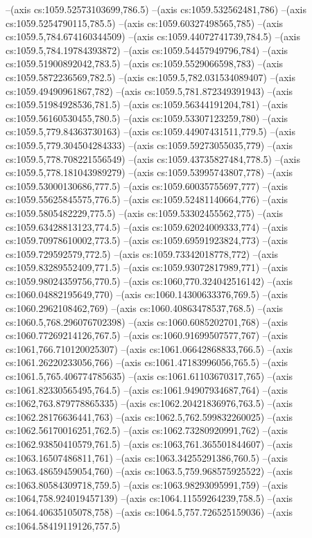 --(axis cs:1059.52573103699,786.5)
--(axis cs:1059.532562481,786)
--(axis cs:1059.5254790115,785.5)
--(axis cs:1059.60327498565,785)
--(axis cs:1059.5,784.674160344509)
--(axis cs:1059.44072741739,784.5)
--(axis cs:1059.5,784.19784393872)
--(axis cs:1059.54457949796,784)
--(axis cs:1059.51900892042,783.5)
--(axis cs:1059.5529066598,783)
--(axis cs:1059.5872236569,782.5)
--(axis cs:1059.5,782.031534089407)
--(axis cs:1059.49490961867,782)
--(axis cs:1059.5,781.872349391943)
--(axis cs:1059.51984928536,781.5)
--(axis cs:1059.56344191204,781)
--(axis cs:1059.56160530455,780.5)
--(axis cs:1059.53307123259,780)
--(axis cs:1059.5,779.84363730163)
--(axis cs:1059.44907431511,779.5)
--(axis cs:1059.5,779.304504284333)
--(axis cs:1059.59273055035,779)
--(axis cs:1059.5,778.708221556549)
--(axis cs:1059.43735827484,778.5)
--(axis cs:1059.5,778.181043989279)
--(axis cs:1059.53995743807,778)
--(axis cs:1059.53000130686,777.5)
--(axis cs:1059.60035755697,777)
--(axis cs:1059.55625845575,776.5)
--(axis cs:1059.52481140664,776)
--(axis cs:1059.5805482229,775.5)
--(axis cs:1059.53302455562,775)
--(axis cs:1059.63428813123,774.5)
--(axis cs:1059.62024009333,774)
--(axis cs:1059.70978610002,773.5)
--(axis cs:1059.69591923824,773)
--(axis cs:1059.729592579,772.5)
--(axis cs:1059.73342018778,772)
--(axis cs:1059.83289552409,771.5)
--(axis cs:1059.93072817989,771)
--(axis cs:1059.98024359756,770.5)
--(axis cs:1060,770.324042516142)
--(axis cs:1060.04882195649,770)
--(axis cs:1060.14300633376,769.5)
--(axis cs:1060.2962108462,769)
--(axis cs:1060.40863478537,768.5)
--(axis cs:1060.5,768.296076702398)
--(axis cs:1060.6085202701,768)
--(axis cs:1060.77269214126,767.5)
--(axis cs:1060.91699507577,767)
--(axis cs:1061,766.710120025307)
--(axis cs:1061.06642868833,766.5)
--(axis cs:1061.26220233056,766)
--(axis cs:1061.47183996056,765.5)
--(axis cs:1061.5,765.406774785635)
--(axis cs:1061.61103670317,765)
--(axis cs:1061.82330565495,764.5)
--(axis cs:1061.94907934687,764)
--(axis cs:1062,763.879778865335)
--(axis cs:1062.20421836976,763.5)
--(axis cs:1062.28176636441,763)
--(axis cs:1062.5,762.599832260025)
--(axis cs:1062.56170016251,762.5)
--(axis cs:1062.73280920991,762)
--(axis cs:1062.93850410579,761.5)
--(axis cs:1063,761.365501844607)
--(axis cs:1063.16507486811,761)
--(axis cs:1063.34255291386,760.5)
--(axis cs:1063.48659459054,760)
--(axis cs:1063.5,759.968575925522)
--(axis cs:1063.80584309718,759.5)
--(axis cs:1063.98293095991,759)
--(axis cs:1064,758.924019457139)
--(axis cs:1064.11559264239,758.5)
--(axis cs:1064.40635105078,758)
--(axis cs:1064.5,757.726525159036)
--(axis cs:1064.58419119126,757.5)
